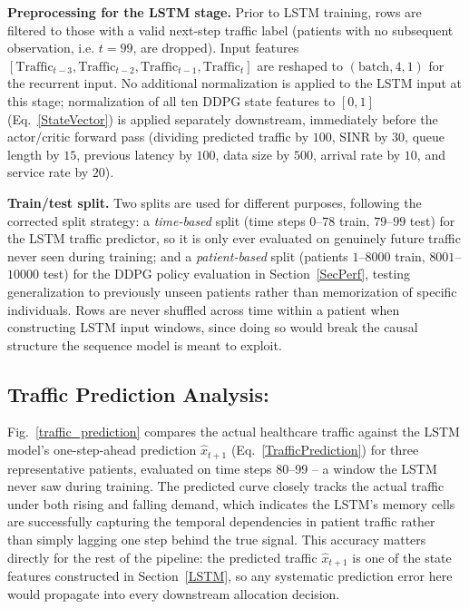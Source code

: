 \documentclass[10pt,journal,compsoc]{IEEEtran}
\begin{document}
\textbf{Preprocessing for the LSTM stage.} Prior to LSTM training, rows are
filtered to those with a valid next-step traffic label (patients with no
subsequent observation, i.e. $t=99$, are dropped). Input features
$[\text{Traffic}_{t-3},\text{Traffic}_{t-2},\text{Traffic}_{t-1},\text{Traffic}_t]$
are reshaped to $(\text{batch},4,1)$ for the recurrent input. No additional
normalization is applied to the LSTM input at this stage; normalization
of all ten DDPG state features to $[0,1]$ (Eq.~\eqref{StateVector}) is applied
separately downstream, immediately before the actor/critic forward pass
(dividing predicted traffic by $100$, SINR by $30$, queue length by $15$,
previous latency by $100$, data size by $500$, arrival rate by $10$, and
service rate by $20$).
 
\textbf{Train/test split.} Two splits are used for different purposes,
following the corrected split strategy: a \emph{time-based} split (time steps
$0$--$78$ train, $79$--$99$ test) for the LSTM traffic predictor, so it is only
ever evaluated on genuinely future traffic never seen during training; and a
\emph{patient-based} split (patients $1$--$8000$ train, $8001$--$10000$ test)
for the DDPG policy evaluation in Section~\ref{SecPerf}, testing generalization
to previously unseen patients rather than memorization of specific
individuals. Rows are never shuffled across time within a patient when
constructing LSTM input windows, since doing so would break the causal
structure the sequence model is meant to exploit.
 


\subsection{Traffic Prediction Analysis:}
Fig.~\ref{traffic_prediction} compares the actual healthcare traffic against the LSTM model's one-step-ahead prediction $\hat{x}_{t+1}$ (Eq.~\eqref{TrafficPrediction}) for three representative patients, evaluated on time steps 80--99 -- a window the LSTM never saw during training. The predicted curve closely tracks the actual traffic under both rising and falling demand, which indicates the LSTM's memory cells are successfully capturing the temporal dependencies in patient traffic rather than simply lagging one step behind the true signal. This accuracy matters directly for the rest of the pipeline: the predicted traffic $\hat{x}_{t+1}$ is one of the state features constructed in Section~\ref{LSTM}, so any systematic prediction error here would propagate into every downstream allocation decision.
\end{document}
